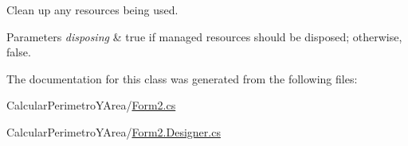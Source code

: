 Clean up any resources being used. 


\begin{DoxyParams}{Parameters}
{\em disposing} & true if managed resources should be disposed; otherwise, false.\\
\hline
\end{DoxyParams}


The documentation for this class was generated from the following files\+:\begin{DoxyCompactItemize}
\item 
Calcular\+Perimetro\+Y\+Area/\hyperlink{_form2_8cs}{Form2.\+cs}\item 
Calcular\+Perimetro\+Y\+Area/\hyperlink{_form2_8_designer_8cs}{Form2.\+Designer.\+cs}\end{DoxyCompactItemize}
